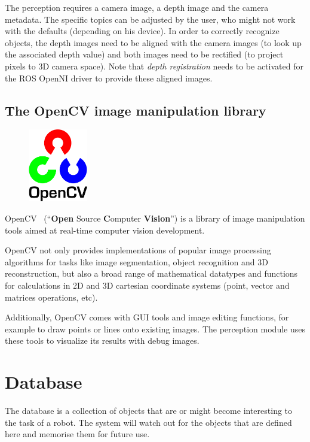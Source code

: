 The perception requires a camera image, a depth image and the camera metadata. The specific topics can be adjusted by the user, who might not work with the defaults (depending on his device). In order to correctly recognize objects, the depth images need to be aligned with the camera images (to look up the associated depth value) and both images need to be rectified (to project pixels to 3D camera space). Note that \textit{depth registration} needs to be activated for the ROS OpenNI driver to provide these aligned images.

\subsection{The OpenCV image manipulation library}
\label{sec:impl-opencv}
\begin{figure}
  \vspace{-10pt}
  \centering
  \includegraphics[width=0.23\textwidth]{images/Logo_OpenCV.png}
  \vspace{-20pt}
\end{figure}

OpenCV~\cite{opencv_library} (``\textbf{Open} Source \textbf{C}omputer \textbf{Vision}'') is a library of image manipulation tools aimed at real-time computer vision development.

OpenCV not only provides implementations of popular image processing algorithms for tasks like image segmentation, object recognition and 3D reconstruction, but also a broad range of mathematical datatypes and functions for calculations in 2D and 3D cartesian coordinate systems (point, vector and matrices operations, etc).

Additionally, OpenCV comes with GUI tools and image editing functions, for example to draw points or lines onto existing images. The perception module uses these tools to visualize its results with debug images.


\section{Database}
\label{sec:impl-db}
The database is a collection of objects that are or might become interesting to the task of a robot. The system will watch out for the objects that are defined here and memorise them for future use. \\

